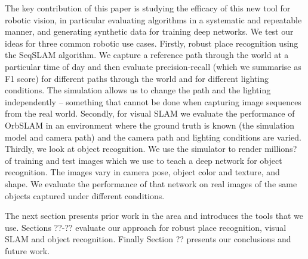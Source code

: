 The key contribution of this paper is studying the efficacy of this new tool for robotic vision, in particular evaluating algorithms in a systematic and repeatable manner, and generating synthetic data for training deep networks.
We test our ideas for three common robotic use cases.
Firstly, robust place recognition using the SeqSLAM\cite{Milford2012} algorithm.  We capture a reference path through the world at a particular time of day and then evaluate precision-recall (which we summarise as F1 score) for different paths through the world and for different lighting conditions.  The simulation allows us to change the path and the lighting independently -- something that cannot be done when capturing image sequences from the real world.
Secondly, for visual SLAM we evaluate the performance of OrbSLAM in an environment where the ground truth is known (the simulation model and camera path) and the camera path and lighting conditions are varied.
Thirdly, we look at object recognition.  We use the simulator to render millions? of training and test images which we use to teach a deep network for object recognition.  The images vary in camera pose, object color and texture, and shape.  We evaluate the performance of that network on real images of the same objects captured under different conditions. 

The next section presents prior work in the area and introduces the tools that we use.  Sections ??-?? evaluate our approach for robust place recognition,
visual SLAM and object recognition.  Finally Section ?? presents our conclusions and future work. 

